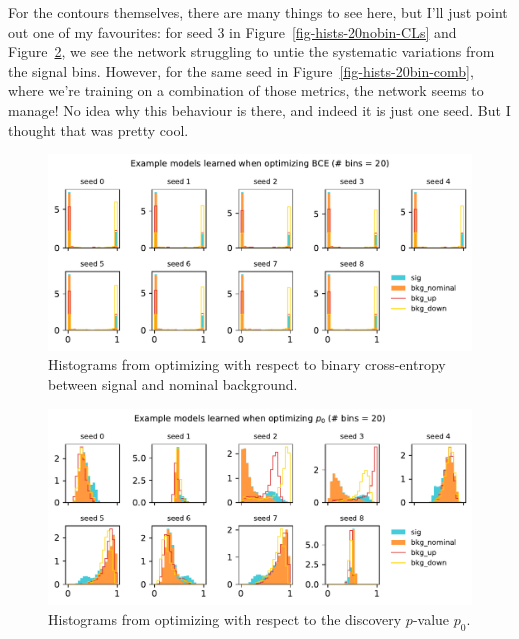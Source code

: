 \documentclass[
  11pt,
  numbers=noendperiod]{book}
\begin{document}
For the contours themselves, there are many things to see here, but I'll
just point out one of my favourites: for seed 3 in
Figure~\ref{fig-hists-20nobin-CLs} and
Figure~\ref{fig-hists-20bin-discovery}, we see the network struggling to
untie the systematic variations from the signal bins. However, for the
same seed in Figure~\ref{fig-hists-20bin-comb}, where we're training on
a combination of those metrics, the network seems to manage! No idea why
this behaviour is there, and indeed it is just one seed. But I thought
that was pretty cool.

\begin{figure}

{\centering \includegraphics{./images/new-hist-models-bce-20nobin.pdf}

}

\caption{\label{fig-hists-20bin-bce}Histograms from optimizing with
respect to binary cross-entropy between signal and nominal background.}

\end{figure}

\begin{figure}

{\centering \includegraphics{./images/new-hist-models-discovery-20nobin.pdf}

}

\caption{\label{fig-hists-20bin-discovery}Histograms from optimizing
with respect to the discovery \(p\)-value \(p_0\).}

\end{figure}
\end{document}
